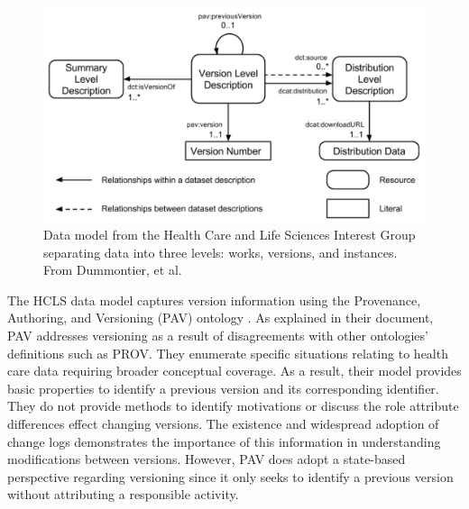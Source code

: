 \begin{figure}%
	\centering
	\includegraphics[scale=0.35]{figures/HCLSModel.png}
	\caption[Data model from the Health Care and Life Sciences Interest Group separating data into three levels: works, versions, and instances.]{Data model from the Health Care and Life Sciences Interest Group separating data into three levels: works, versions, and instances.  From Dummontier, et al. \cite{Dummontier2016}}
	\label{HCLSModel}
\end{figure}

The HCLS data model captures version information using the Provenance, Authoring, and Versioning (PAV) ontology \cite{Ciccarese2013}.
As explained in their document, PAV addresses versioning as a result of disagreements with other ontologies' definitions such as PROV.
They enumerate specific situations relating to health care data requiring broader conceptual coverage.
As a result, their model provides basic properties to identify a previous version and its corresponding identifier.
They do not provide methods to identify motivations or discuss the role attribute differences effect changing versions.
The existence and widespread adoption of change logs demonstrates the importance of this information in understanding modifications between versions.
However, PAV does adopt a state-based perspective regarding versioning since it only seeks to identify a previous version without attributing a responsible activity.


